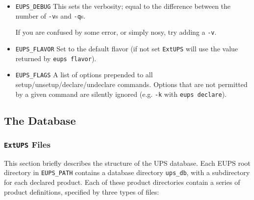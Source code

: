\documentclass{article}
\newcommand{\code}[1]{\texttt{#1}}
\newcommand{\eups}{\code{ExtUPS}}
\begin{document}
\begin{itemize}
  \item \code{EUPS\_DEBUG}
    This sets the verbosity; equal to the difference between the number of \code{-v}s
    and \code{-q}s.

    If you are confused by some error, or simply nosy, try adding a \code{-v}.

  \item \code{EUPS\_FLAVOR}
    Set to the default flavor (if not set \eups{} will use the value returned
    by \code{eups flavor}).

  \item \code{EUPS\_FLAGS}
    A list of options prepended to all setup/unsetup/declare/undeclare commands. Options
    that are not permitted by a given command are silently ignored (e.g. \code{-k}
    with \code{eups declare}).
\end{itemize}

\subsection{The Database}

\subsubsection{\eups{} Files}

This section briefly describes the structure of the UPS database. Each
EUPS root directory in \code{EUPS\_PATH} contains a database directory
\code{ups\_db}, with a subdirectory for each declared product.  Each
of these product directories contain a series of product definitions,
specified by three types of files:
\end{document}
